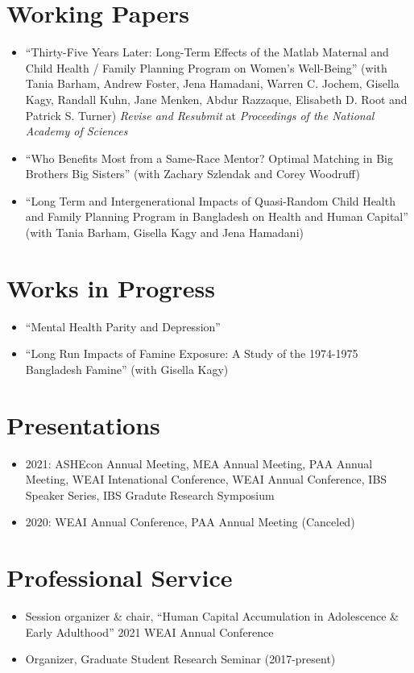 \documentclass[letterpaper]{article}
\begin{document}
\section*{Working Papers}
\begin{itemize}
	\item ``Thirty-Five Years Later: Long-Term Effects of the Matlab Maternal and Child Health / Family Planning Program on Women's Well-Being'' (with Tania Barham, Andrew Foster, Jena Hamadani, Warren C. Jochem, Gisella Kagy, Randall Kuhn, Jane Menken, Abdur Razzaque, Elisabeth D. Root and Patrick S. Turner) \textit{Revise and Resubmit} at \textit{Proceedings of the National Academy of Sciences}
	\item ``Who Benefits Most from a Same-Race Mentor? Optimal Matching in Big Brothers Big Sisters'' (with Zachary Szlendak and Corey Woodruff)
	\item ``Long Term and Intergenerational Impacts of Quasi-Random Child Health and Family Planning Program in Bangladesh on Health and Human Capital'' (with Tania Barham, Gisella Kagy and Jena Hamadani)
	
\end{itemize}

\section*{Works in Progress}
\begin{itemize}
	\item ``Mental Health Parity and Depression''
	\item ``Long Run Impacts of Famine Exposure: A Study of the 1974-1975 Bangladesh Famine'' (with Gisella Kagy)
\end{itemize}

\section*{Presentations}
\begin{itemize}
	\item[] 2021: ASHEcon Annual Meeting, MEA Annual Meeting, PAA Annual Meeting, WEAI Intenational Conference, WEAI Annual Conference, IBS Speaker Series, IBS Gradute Research Symposium
	\item[] 2020: WEAI Annual Conference, PAA Annual Meeting (Canceled)
\end{itemize}

\section*{Professional Service}
\begin{itemize}
	\item[] Session organizer \& chair, ``Human Capital Accumulation in Adolescence \& Early Adulthood'' 2021 WEAI Annual Conference 
	\item[] Organizer, Graduate Student Research Seminar (2017-present)
\end{itemize}
\end{document}
